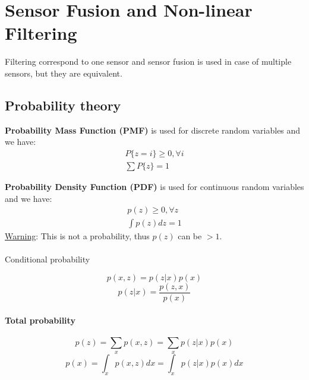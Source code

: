 \chapter{Sensor Fusion and Non-linear Filtering}

Filtering correspond to one sensor and sensor fusion is used in case of multiple sensors, but they are equivalent.

\section{Probability theory}
\textbf{Probability Mass Function (PMF)} is used for discrete random variables and we have:
\begin{equation}
\begin{split}
    P\{z=i\} \ge 0,  \forall i \\
    \sum P\{z\} = 1
\end{split}
\end{equation}

\textbf{Probability Density Function (PDF)} is used for continuous random variables and we have:
\begin{equation}
    \begin{split}
        p(z) \ge 0 ,\forall z \\
        \int p(z) dz = 1
    \end{split}
\end{equation}
\underline{Warning}: This is not a probability, thus $p(z)$ can be $>1$.

\subsubsection{}{Conditional probability}

\begin{equation}
    p(x, z) = p(z|x)p(x)
\end{equation}
\begin{equation}
    p(z|x) = \frac{p(z, x)}{p(x)}
\end{equation}

\subsubsection{Total probability}
\begin{equation}
    p(z) = \sum_{x} p(x, z) = \sum_{x} p(z|x)p(x)
\end{equation}
\begin{equation}
    p(x) = \int_x p(x, z)dx = \int_x p(z|x)p(x)dx
\end{equation}

